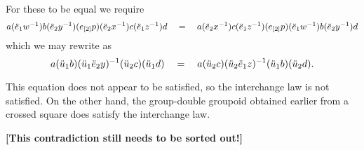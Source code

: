 \noindent
For these to be equal we require
$$
a(\ddot{e}_1 w^{-1})b
         (\ddot{e}_2 y^{-1})(e_{[2]} p)(\ddot{e}_2 x^{-1})
              c(\ddot{e}_1 z^{-1})d 
\quad=\quad
a(\ddot{e}_2 x^{-1})c
         (\ddot{e}_1 z^{-1})(e_{[2]} p)(\ddot{e}_1 w^{-1})
              b(\ddot{e}_2 y^{-1})d 
$$
which we may rewrite as
$$
a(\ddot{u}_1 b)(\ddot{u}_1\ddot{e}_2 y)^{-1}(\ddot{u}_2 c)(\ddot{u}_1 d)
\quad=\quad
a(\ddot{u}_2 c)(\ddot{u}_2\ddot{e}_1 z)^{-1}(\ddot{u}_1 b)(\ddot{u}_2 d).
$$

\bigskip\noindent
This equation does not appear to be satisfied, 
so the interchange law is not satisfied.
On the other hand, the group-double groupoid obtained earlier from 
a crossed square does satisfy the interchange law.

\bigskip\noindent
{\bf [This contradiction still needs to be sorted out!]}








